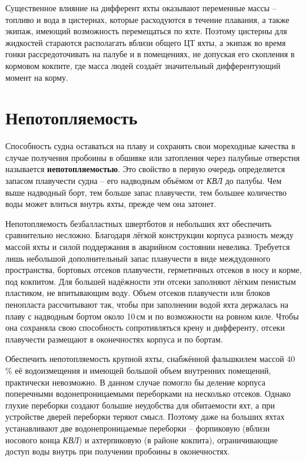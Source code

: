 Существенное влияние на дифферент яхты оказывают переменные массы \---
топливо и вода в цистернах, которые расходуются в течение плавания, а
также экипаж, имеющий возможность перемещаться по яхте. Поэтому
цистерны для жидкостей стараются располагать вблизи общего ЦТ яхты, а
экипаж во время гонки рассредоточивать на палубе и в помещениях, не
допуская его скопления в кормовом кокпите, где масса людей создаёт
значительный дифферентующий момент на корму.

\section{Непотопляемость}

Способность судна оставаться на плаву и сохранять свои мореходные
качества в случае получения пробоины в обшивке или затопления через
палубные отверстия называется
\textbf{непотопляемостью}. Это свойство в
первую очередь определяется запасом плавучести судна \--- его
надводным объёмом от \textit{КВЛ} до палубы. Чем выше надводный борт,
тем больше запас плавучести, тем большее количество воды может влиться
внутрь яхты, прежде чем она затонет.

Непотопляемость безбалластных швертботов и небольших яхт обеспечить
сравнительно несложно. Благодаря лёгкой конструкции корпуса разность
между массой яхты и силой поддержания в аварийном состоянии
невелика. Требуется лишь небольшой дополнительный запас плавучести в
виде междудонного пространства, бортовых отсеков плавучести,
герметичных отсеков в носу и корме, под кокпитом. Для большей
надёжности эти отсеки заполняют лёгким пенистым пластиком, не
впитывающим воду. Объем отсеков плавучести или блоков пенопласта
рассчитывают так, чтобы при заполнении водой яхта держалась на плаву с
надводным бортом около 10\,см и по возможности на ровном киле. Чтобы
она сохраняла свою способность сопротивляться крену и дифференту,
отсеки плавучести размещают в оконечностях корпуса и по бортам.

Обеспечить непотопляемость крупной яхты, снабжённой фальшкилем массой
40\,\% её водоизмещения и имеющей большой объем внутренних
помещений, практически невозможно. В данном случае помогло бы деление
корпуса поперечными водонепроницаемыми переборками на несколько
отсеков. Однако глухие переборки создают большие неудобства для
обитаемости яхт, а при устройстве дверей переборки теряют
смысл. Поэтому даже на больших яхтах устанавливают две
водонепроницаемые переборки \--- форпиковую (вблизи носового конца
\textit{КВЛ}) и ахтерпиковую (в районе кокпита), ограничивающие доступ
воды внутрь при получении пробоины в оконечностях.

